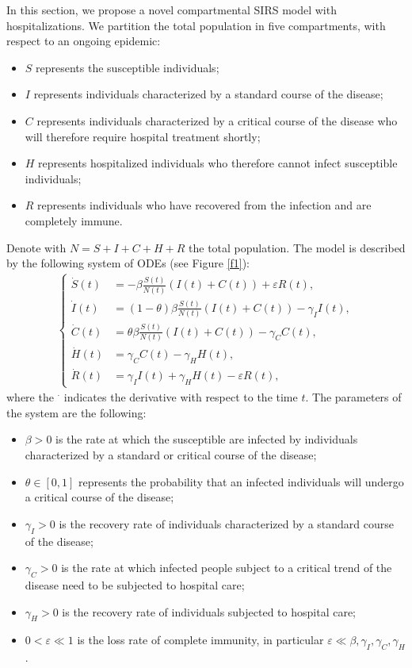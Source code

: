 \documentclass[11pt,reqno]{amsart}
\theoremstyle{boldremark}
\begin{document}
\noindent In this section, we propose a novel compartmental SIRS model with hospitalizations. We partition the total population in five compartments, with respect to an ongoing epidemic:
\begin{itemize}
    \item $S$ represents the susceptible individuals; 
    \item $I$ represents individuals characterized by a standard course of the disease; 
    \item $C$ represents individuals characterized by a critical course of the disease who will therefore require hospital treatment shortly; 
    \item $H$ represents hospitalized individuals who therefore cannot infect susceptible individuals; 
    \item $R$ represents individuals who have recovered from the infection and are completely immune. 
\end{itemize}
Denote with $N=S+I+C+H+R$ the total population. The model is described by the following system of ODEs (see Figure \ref{f1}): 
\begin{align} \label{eq1}
\left\{
\begin{aligned}
    \dot{S}(t) &= -\beta \frac{S(t)}{N(t)}  (I(t)+C(t)) + \varepsilon R(t), \\ 
    \dot{I}(t) &= (1-\theta) \beta \frac{S(t)}{N(t)}  (I(t)+C(t)) - \gamma_I I(t), \\ 
    \dot{C}(t) &= \theta \beta \frac{S(t)}{N(t)}(I(t)+C(t)) - \gamma_C C(t), \\ 
    \dot{H}(t) &= \gamma_C C(t) - \gamma_H H(t), \\ 
    \dot{R}(t) &= \gamma_I I(t) + \gamma_H H(t) - \varepsilon R(t), 
\end{aligned}
\right.
\end{align}
where the $^\cdot$ indicates the derivative with respect to the time $t$. The parameters of the system are the following: 
\begin{itemize}
    \item $\beta>0$ is the rate at which the susceptible are infected by individuals characterized by a standard or critical course of the disease; 
    \item $\theta \in [0,1]$ represents the probability that an infected individuals will undergo a critical course of the disease; 
    \item $\gamma_I>0$ is the recovery rate of individuals characterized by a standard course of the disease; 
    \item $\gamma_C > 0$ is the rate at which infected people subject to a critical trend of the disease need to be subjected to hospital care; 
    \item $\gamma_H > 0$ is the recovery rate of individuals subjected to hospital care; 
    \item $0 < \varepsilon \ll 1$  is the loss rate of complete immunity, in particular $\varepsilon \ll \beta, \gamma_I, \gamma_C, \gamma_H$. 
\end{itemize}
\end{document}
